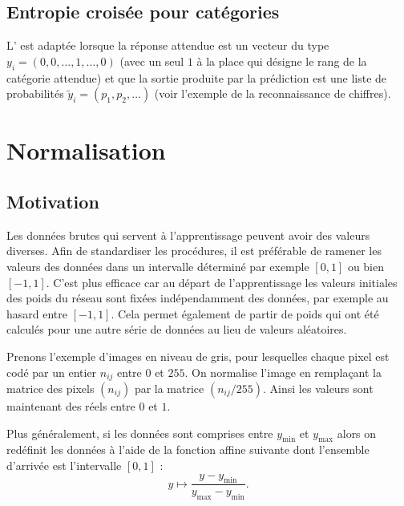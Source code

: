 \documentclass[11pt,class=report,crop=false]{standalone}
\begin{document}
    
\subsection{Entropie croisée pour catégories}

L' est adaptée lorsque la réponse attendue est un vecteur du type $y_i=(0,0,\ldots,1,\ldots,0)$ (avec un seul $1$ à la place qui désigne le rang de la catégorie attendue) et que la sortie produite par la prédiction est une liste de probabilités $\widetilde y_i = (p_1,p_2,\ldots)$ (voir l'exemple de la reconnaissance de chiffres).
 
 
 
\section{Normalisation}


\subsection{Motivation}

Les données brutes qui servent à l'apprentissage peuvent avoir des valeurs diverses.
Afin de standardiser les procédures, il est préférable de ramener les valeurs des données dans un intervalle déterminé par exemple $[0,1]$ ou bien $[-1,1]$. 
C'est plus efficace car au départ de l'apprentissage les valeurs initiales des poids du réseau sont fixées indépendamment des données, par exemple au hasard entre $[-1,1]$.
Cela permet également de partir de poids qui ont été calculés pour une autre série de données au lieu de valeurs aléatoires.

Prenons l'exemple d'images en niveau de gris, pour lesquelles chaque pixel est codé par un entier $n_{ij}$ entre $0$ et $255$. On \og{}normalise\fg{} l'image en remplaçant la matrice des pixels $(n_{ij})$ par la matrice $(n_{ij}/255)$. Ainsi les valeurs sont maintenant des réels entre $0$ et $1$.


Plus généralement, si les données sont comprises entre $y_{\min}$ et $y_{\max}$ alors on redéfinit les données à l'aide de la fonction affine suivante dont l'ensemble d'arrivée est l'intervalle $[0,1]$ : 
$$y \mapsto \frac{y - y_{\min}}{y_{\max} - y_{\min}}.$$ 
\end{document}
